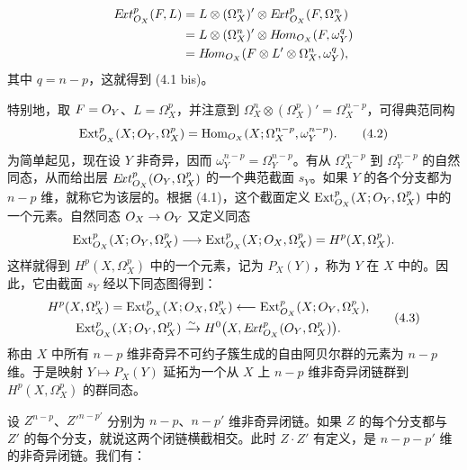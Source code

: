 \begin{align*}
E\!xt_{O_X}^{p}(F,L)
&=L\otimes(\Omega_X^n)'\otimes E\!xt_{O_X}^{p}(F,\Omega_X^n)\\
&=L\otimes(\Omega_X^n)'\otimes H\!om_{O_X}(F,\omega_Y^q)\\
&=H\!om_{O_X}(F\otimes L'\otimes\Omega_X^n,\omega_Y^q),
\end{align*}
其中 $q=n-p$，这就得到 (4.1 bis)。

特别地，取 $F=O_Y$、$L=\Omega_X^p$，并注意到 $\Omega_X^n\otimes(\Omega_X^p)'=\Omega_X^{n-p}$，可得典范同构
\begin{equation}
\operatorname{Ext}_{O_X}^{p}(X;O_Y,\Omega_X^p)
=\operatorname{Hom}_{O_X}(X;\Omega_X^{n-p},\omega_Y^{n-p}).
\tag{4.2}
\end{equation}
为简单起见，现在设 $Y$ 非奇异，因而 $\omega_Y^{n-p}=\Omega_Y^{n-p}$。有从 $\Omega_X^{n-p}$ 到 $\Omega_Y^{n-p}$ 的自然同态，从而给出层 $E\!xt_{O_X}^{p}(O_Y,\Omega_X^p)$ 的一个典范截面 $s_Y$。如果 $Y$ 的各个分支都为 $n-p$ 维，就称它为该层的。根据 (4.1)，这个截面定义 $\operatorname{Ext}_{O_X}^{p}(X;O_Y,\Omega_X^p)$ 中的一个元素。自然同态 $O_X\to O_Y$ 又定义同态
\[
\operatorname{Ext}_{O_X}^{p}(X;O_Y,\Omega_X^p)
\longrightarrow\operatorname{Ext}_{O_X}^{p}(X;O_X,\Omega_X^p)
=H^p(X,\Omega_X^p).
\]
这样就得到 $H^p(X,\Omega_X^p)$ 中的一个元素，记为 $P_X(Y)$，称为 $Y$ 在 $X$ 中的。因此，它由截面 $s_Y$ 经以下同态图得到：
\begin{equation}
\begin{gathered}
H^p(X,\Omega_X^p)=\operatorname{Ext}_{O_X}^{p}(X;O_X,\Omega_X^p)
\longleftarrow\operatorname{Ext}_{O_X}^{p}(X;O_Y,\Omega_X^p),\\
\operatorname{Ext}_{O_X}^{p}(X;O_Y,\Omega_X^p)
\xrightarrow{\sim}H^0\bigl(X,E\!xt_{O_X}^{p}(O_Y,\Omega_X^p)\bigr).
\end{gathered}\tag{4.3}
\end{equation}
称由 $X$ 中所有 $n-p$ 维非奇异不可约子簇生成的自由阿贝尔群的元素为 $n-p$ 维。于是映射 $Y\mapsto P_X(Y)$ 延拓为一个从 $X$ 上 $n-p$ 维非奇异闭链群到 $H^p(X,\Omega_X^p)$ 的群同态。

设 $Z^{n-p}$、$Z'^{n-p'}$ 分别为 $n-p$、$n-p'$ 维非奇异闭链。如果 $Z$ 的每个分支都与 $Z'$ 的每个分支，就说这两个闭链横截相交。此时 $Z\cdot Z'$ 有定义，是 $n-p-p'$ 维的非奇异闭链。我们有：

